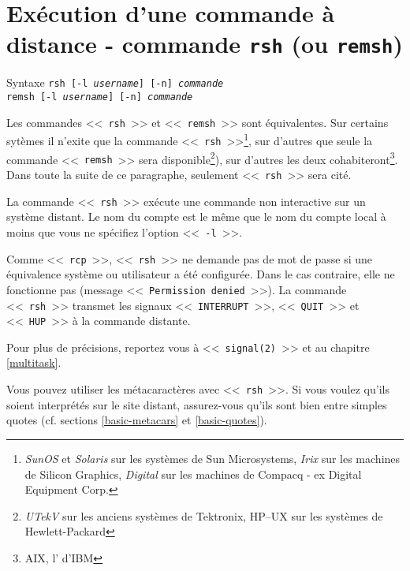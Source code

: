 \section{\texorpdfstring{Ex{\'e}cution d'une commande {\`a} distance - commande {\tt rsh} (ou {\tt remsh})}{Ex{\'e}cution d'une commande {\`a} distance - commande rsh (ou remsh)}}

\begin{definition}{Syntaxe}
{\tt rsh [-l {\it username}] [-n] {\it commande}}\\
{\tt remsh [-l {\it username}] [-n] {\it commande}}
\end{definition}

Les commandes <<~\texttt{rsh}~>> et <<~\texttt{remsh}~>> sont {\'e}quivalentes.
Sur certains syt{\`e}mes il n'exite que la commande <<~\texttt{rsh}~>>\footnote{\textsl{SunOS} et  \textsl{Solaris} sur les syst{\`e}mes de Sun Microsystems, \textsl{Irix} sur les machines de Silicon Graphics, \textsl{Digital {\Unix}} sur les machines de Compacq - ex Digital Equipment Corp.}, sur d'autres que seule la commande <<~{\tt remsh}~>> sera disponible\footnote{\textsl{UTekV} sur les anciens syst{\`e}mes {\Unix} de Tektronix, \textsf{HP--UX} sur les syst{\`e}mes de Hewlett-Packard}), sur d'autres les deux cohabiteront\footnote{AIX, l'{\Unix} d'IBM}. Dans toute la suite de ce paragraphe, seulement <<~\texttt{rsh}~>> sera cit{\'e}.

La commande <<~{\tt rsh}~>> ex{\'e}cute une commande non interactive sur un syst{\`e}me distant. Le nom du compte est le m{\^e}me que le nom du compte local {\`a} moins que vous ne sp{\'e}cifiez l'option <<~{\tt -l}~>>.

Comme <<~{\tt rcp}~>>, <<~{\tt rsh}~>> ne demande pas de mot de passe si une {\'e}quivalence syst{\`e}me ou utilisateur a {\'e}t{\'e} configur{\'e}e. Dans le cas contraire, elle ne fonctionne pas (message <<~{\tt Permission denied}~>>). La commande <<~{\tt rsh}~>> transmet les signaux <<~{\tt INTERRUPT}~>>, <<~{\tt QUIT}~>> et <<~{\tt HUP}~>> {\`a} la commande distante.

Pour plus de pr{\'e}cisions, reportez vous {\`a} <<~{\tt signal(2)}~>> et au chapitre \ref{multitask}.

Vous pouvez utiliser les m{\'e}tacaract{\`e}res avec <<~{\tt rsh}~>>. Si vous voulez qu'ils soient interpr{\'e}t{\'e}s sur le site distant, assurez-vous qu'ils sont bien entre simples quotes (cf. sections \ref{basic-metacars} et \ref{basic-quotes}).

